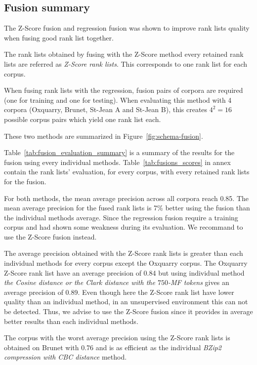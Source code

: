 \subsection{Fusion summary}

The Z-Score fusion and regression fusion was shown to improve rank lists quality when fusing good rank list together.

The rank lists obtained by fusing with the Z-Score method every retained rank lists are referred as \textit{Z-Score rank lists}.
This corresponds to one rank list for each corpus.

When fusing rank lists with the regression, fusion pairs of corpora are required (one for training and one for testing).
When evaluating this method with 4 corpora (Oxquarry, Brunet, St-Jean A and St-Jean B), this creates $4^2 = 16$ possible corpus pairs which yield one rank list each.

These two methods are summarized in Figure~\ref{fig:schema-fusion}.

Table~\ref{tab:fusion_evaluation_summary} is a summary of the results for the fusion using every individual methods.
Table~\ref{tab:fusions_scores} in annex contain the rank lists' evaluation, for every corpus, with every retained rank lists for the fusion.

For both methods, the mean average precision across all corpora reach 0.85.
The mean average precision for the fused rank lists is 7\% better using the fusion than the individual methods average.
Since the regression fusion require a training corpus and had shown some weakness during its evaluation.
We recommand to use the Z-Score fusion instead.

The average precision obtained with the Z-Score rank lists is greater than each individual methods for every corpus except the Oxquarry corpus.
The Oxquarry Z-Score rank list have an average precision of 0.84 but using individual method \textit{the Cosine distance or the Clark distance with the $750$-MF tokens} gives an average precision of 0.89.
Even though here the Z-Score rank list have lower quality than an individual method, in an unsupervised environment this can not be detected.
Thus, we advise to use the Z-Score fusion since it provides in average better results than each individual methods.

The corpus with the worst average precision using the Z-Score rank lists is obtained on Brunet with 0.76 and is as efficient as the individual \textit{BZip2 compression with CBC distance} method.

